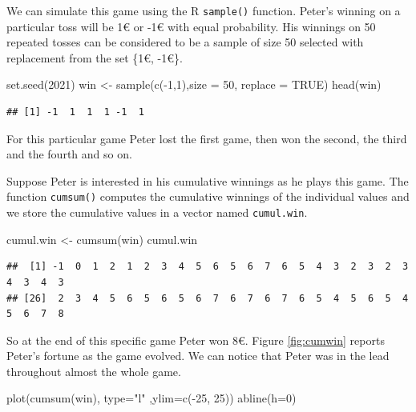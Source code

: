 \documentclass[
]{book}
\newenvironment{Shaded}{\begin{snugshade}}{\end{snugshade}}
\newcommand{\AttributeTok}[1]{\textcolor[rgb]{0.77,0.63,0.00}{#1}}
\newcommand{\ConstantTok}[1]{\textcolor[rgb]{0.00,0.00,0.00}{#1}}
\newcommand{\DecValTok}[1]{\textcolor[rgb]{0.00,0.00,0.81}{#1}}
\newcommand{\FunctionTok}[1]{\textcolor[rgb]{0.00,0.00,0.00}{#1}}
\newcommand{\NormalTok}[1]{#1}
\newcommand{\OtherTok}[1]{\textcolor[rgb]{0.56,0.35,0.01}{#1}}
\newcommand{\SpecialCharTok}[1]{\textcolor[rgb]{0.00,0.00,0.00}{#1}}
\newcommand{\StringTok}[1]{\textcolor[rgb]{0.31,0.60,0.02}{#1}}
\begin{document}
We can simulate this game using the R \texttt{sample()} function. Peter's winning on a particular toss will be 1€ or -1€ with equal probability. His winnings on 50 repeated tosses can be considered to be a sample of size 50 selected with replacement from the set \{1€, -1€\}.

\begin{Shaded}
\begin{Highlighting}[]
\FunctionTok{set.seed}\NormalTok{(}\DecValTok{2021}\NormalTok{)}
\NormalTok{win }\OtherTok{\textless{}{-}} \FunctionTok{sample}\NormalTok{(}\FunctionTok{c}\NormalTok{(}\SpecialCharTok{{-}}\DecValTok{1}\NormalTok{,}\DecValTok{1}\NormalTok{),}\AttributeTok{size =} \DecValTok{50}\NormalTok{, }\AttributeTok{replace =} \ConstantTok{TRUE}\NormalTok{)}
\FunctionTok{head}\NormalTok{(win)}
\end{Highlighting}
\end{Shaded}

\begin{verbatim}
## [1] -1  1  1  1 -1  1
\end{verbatim}

For this particular game Peter lost the first game, then won the second, the third and the fourth and so on.

Suppose Peter is interested in his cumulative winnings as he plays this game. The function \texttt{cumsum()} computes the cumulative winnings of the individual values and we store the cumulative values in a vector named \texttt{cumul.win}.

\begin{Shaded}
\begin{Highlighting}[]
\NormalTok{cumul.win }\OtherTok{\textless{}{-}} \FunctionTok{cumsum}\NormalTok{(win) }
\NormalTok{cumul.win}
\end{Highlighting}
\end{Shaded}

\begin{verbatim}
##  [1] -1  0  1  2  1  2  3  4  5  6  5  6  7  6  5  4  3  2  3  2  3  4  3  4  3
## [26]  2  3  4  5  6  5  6  5  6  7  6  7  6  7  6  5  4  5  6  5  4  5  6  7  8
\end{verbatim}

So at the end of this specific game Peter won 8€. Figure \ref{fig:cumwin} reports Peter's fortune as the game evolved. We can notice that Peter was in the lead throughout almost the whole game.

\begin{Shaded}
\begin{Highlighting}[]
\FunctionTok{plot}\NormalTok{(}\FunctionTok{cumsum}\NormalTok{(win), }\AttributeTok{type=}\StringTok{"l"}\NormalTok{ ,}\AttributeTok{ylim=}\FunctionTok{c}\NormalTok{(}\SpecialCharTok{{-}}\DecValTok{25}\NormalTok{, }\DecValTok{25}\NormalTok{))}
\FunctionTok{abline}\NormalTok{(}\AttributeTok{h=}\DecValTok{0}\NormalTok{)}
\end{Highlighting}
\end{Shaded}
\end{document}
